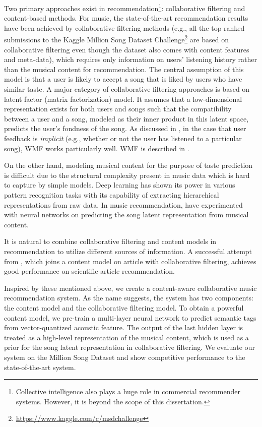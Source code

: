 Two primary approaches exist in recommendation\footnote{Collective intelligence also plays a huge role in commercial recommender systems. However, it is beyond the scope of this dissertation.}: collaborative filtering and content-based methods. For music, the state-of-the-art recommendation results have been achieved by collaborative filtering methods (e.g., all the top-ranked submissions to the Kaggle Million Song Dataset Challenge\footnote{\url{https://www.kaggle.com/c/msdchallenge}} are based on collaborative filtering even though the dataset also comes with content features and meta-data), which requires only information on users' listening history rather than the musical content for recommendation. The central assumption of this model is that a user is likely to accept a song that is liked by users who have similar taste.  A major category of collaborative filtering approaches is based on latent factor (matrix factorization) model. It assumes that a low-dimensional representation exists for both users and songs such that the compatibility between a user and a song, modeled as their inner product in this latent space, predicts the user's fondness of the song. As discussed in , in the case that user feedback is \emph{implicit} (e.g., whether or not the user has listened to a particular song), \gls{WMF} \citep{hu2008collaborative} works particularly well. \gls{WMF} is described in .

On the other hand, modeling musical content for the purpose of taste prediction is difficult due to the structural complexity present in music data which is hard to capture by simple models. Deep learning has shown its power in various pattern recognition tasks with its capability of extracting hierarchical representations from raw data. In music recommendation, \citet{van2013deep} have experimented with neural networks on predicting the song latent representation from musical content.  

It is natural to combine collaborative filtering and content models in recommendation to utilize different sources of information. A successful attempt from \citet{wang2011collaborative}, which joins a content model on article with collaborative filtering, achieves good performance on scientific article recommendation.

Inspired by these mentioned above, we create a content-aware collaborative music recommendation system. As the name suggests, the system has two components: the content model and the collaborative filtering model. To obtain a powerful content model, we pre-train a multi-layer neural network to predict semantic tags from vector-quantized acoustic feature. The output of the last hidden layer is treated as a high-level representation of the musical content, which is used as a prior for the song latent representation in collaborative filtering. We evaluate our system on the Million Song Dataset and show competitive performance to the state-of-the-art system.



